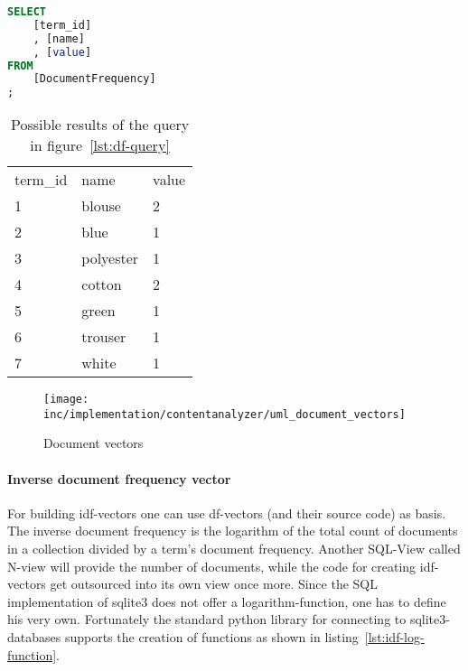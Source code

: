 \begin{lstlisting}[language=SQL,caption={SQL query for generating df-vectors},label={lst:df-query},float=h]
SELECT
    [term_id]
    , [name]
    , [value]
FROM
    [DocumentFrequency]
;
\end{lstlisting}

\begin{table}
    \center
    \begin{tabular}{ l | l | l }
        \rowcolor{\dustRowHead}
        \multicolumn{3}{ c }{\textbf{df}}\\\hline
        term\_id    & name      & value\\\hline
        1           & blouse    & 2\\
        2           & blue      & 1\\
        3           & polyester & 1\\
        4           & cotton    & 2\\
        5           & green     & 1\\
        6           & trouser   & 1\\
        7           & white     & 1\\
    \end{tabular}
    \caption{Possible results of the query in figure~\ref{lst:df-query}}
    \label{tab:df-query-result}
\end{table}

\begin{figure}[h]
    \center
    \texttt{[image: inc/implementation/contentanalyzer/uml\_document\_vectors]}
    \caption{Document vectors}
    \label{fig:uml-document-vectors}
\end{figure}

\FloatBarrier

\paragraph{Inverse document frequency vector}
For building idf-vectors one can use df-vectors (and their source code) as basis.
The inverse document frequency is the logarithm of the total count of documents in a collection divided by a term's document frequency.
Another SQL-View called N-view will provide the number of documents, while the code for creating idf-vectors get outsourced into its own view once more.
Since the SQL implementation of \gls{sqlite3} does not offer a logarithm-function, one has to define his very own.
Fortunately the standard python library for connecting to sqlite3-databases supports the creation of functions as shown in listing~\ref{lst:idf-log-function}.


